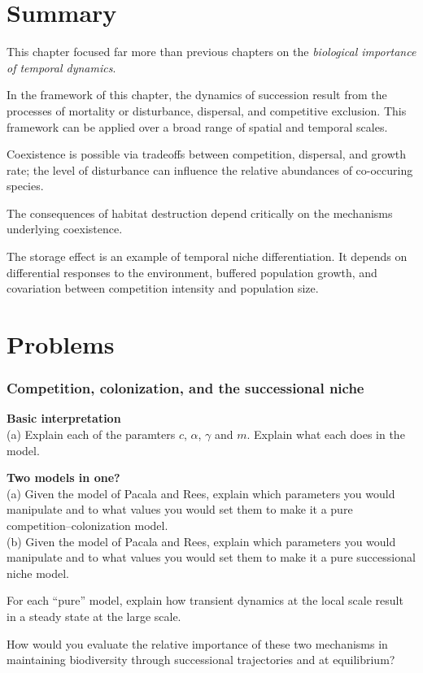 \section{Summary}
This chapter focused far more than previous chapters on the \emph{biological importance of temporal dynamics}. 
\begin{compactitem}
  \item In the framework of this chapter, the dynamics of succession result from the processes of mortality or disturbance, dispersal, and competitive exclusion.  This framework can be applied over a broad range of spatial and temporal scales. 
    \item Coexistence is possible via tradeoffs between competition, dispersal, and growth rate; the level of disturbance can influence the relative abundances of co-occuring species.
      \item The consequences of habitat destruction depend critically on the mechanisms underlying coexistence. 
        \item The storage effect is an example of temporal niche differentiation. It depends on differential responses to the environment, buffered population growth, and covariation between competition intensity and population size.
\end{compactitem}
 

\section*{Problems}

\subsubsection*{Competition, colonization, and the successional niche}
\begin{prob}
  \textbf{Basic interpretation}\\
 (a) Explain each of the paramters $c$, $\alpha$, $\gamma$ and $m$. Explain what each does in the model.\\
\end{prob}
\begin{prob}
  \textbf{Two models in one?}\\
   (a) Given the model of Pacala and Rees, explain which parameters you would manipulate and to what values you would set them to make it a pure competition--colonization model.\\
(b)  Given the model of Pacala and Rees, explain which parameters you would manipulate and to what values you would set them to make it a pure successional niche model.\\
\end{prob}
\begin{prob}
  For each ``pure'' model, explain how transient dynamics at the local scale result in a steady state at the large scale.
\end{prob}
\begin{prob}
  How would you evaluate the relative importance of these two mechanisms in maintaining biodiversity through successional trajectories and at equilibrium?
\end{prob}
